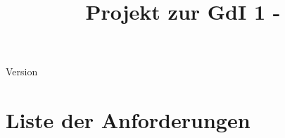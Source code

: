 \author{\labTeam}


\title{Projekt zur GdI 1 - \labTerm}



\maketitle										%
\centerline{Version \version}
\tableofcontents %
\newpage
\setlength\parskip{0.25\baselineskip}












\section{Liste der Anforderungen}
\listofrequirements


